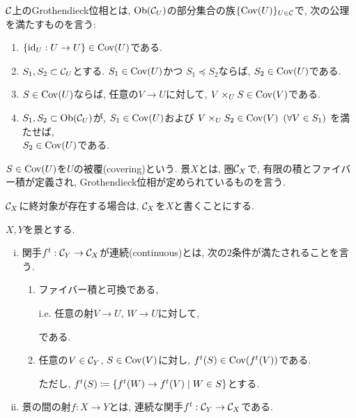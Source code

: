 \documentclass[../main]{subfiles}
\begin{document}
\begin{dfn}
  $\mathcal{C}$上のGrothendieck位相とは,
  $\mathrm{Ob}(\mathcal{C}_U)$の部分集合の族$\{\mathrm{Cov}(U)\}_{U\in\mathcal{C}}$で,
  次の公理を満たすものを言う:
  \begin{enumerate}[(GT1)]
    \setlength{\itemindent}{1em} \setlength{\labelsep}{1em}
    \item $\left\{ \mathrm{id}_U : U\to U \right\} \in \mathrm{Cov}(U)$である.
    \item $S_1, S_2\subset\mathcal{C}_U$とする.
      $S_1\in\mathrm{Cov}(U)$かつ
      $S_1\preceq S_2$ならば,
      $S_2\in\mathrm{Cov}(U)$である.
    \item $S\in\mathrm{Cov}(U)$ならば,
      任意の$V\to U$に対して,
      $V\times_U S\in \mathrm{Cov}(V)$である.
    \item $S_1,S_2\subset\mathrm{Ob}(\mathcal{C}_U)$が,
      $S_1\in\mathrm{Cov}(U)$および
      $V\times_U S_2\in\mathrm{Cov}(V)\hspace{0.5em}(\forall V\in S_1)$
      を満たせば,
      \\
      $S_2\in\mathrm{Cov}(U)$である.
  \end{enumerate}
\end{dfn}

$S\in\mathrm{Cov}(U)$を$U$の被覆(covering)という.
景$X$とは,
圏$\mathcal{C}_X$で,
有限の積とファイバー積が定義され,
Grothendieck位相が定められているものを言う.

$\mathcal{C}_X$に終対象が存在する場合は,
$\mathcal{C}_X$を$X$と書くことにする.

\begin{dfn}
  $X, Y$を景とする.
  \begin{enumerate}[(i)]
    \item 関手$f^t:\mathcal{C}_Y\to\mathcal{C}_X$が連続(continuous)とは,
      次の2条件が満たされることを言う.
      \begin{enumerate}[(1)]
        \item ファイバー積と可換である,

          i.e. 任意の射$V\to U,\,W\to U$に対して,
          である.
        \item 任意の$V\in\mathcal{C}_Y$, $S\in\mathrm{Cov}(V)$に対し,
          $f^t(S)\in\mathrm{Cov}(f^t(V))$である.

          ただし, 
          $f^t(S)\coloneqq
          \left\{
            f^t(W)\to f^t(V)
            \mathrel{}\middle|\mathrel{}
            W\in S
            \right\}$とする.
      \end{enumerate}
    \item 景の間の射$f:X\to Y$とは,
      連続な関手$f^t:\mathcal{C}_Y\to\mathcal{C}_X$である.
  \end{enumerate}
\end{dfn}
\end{document}
